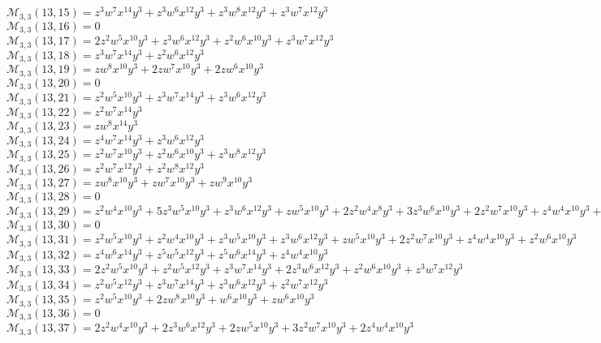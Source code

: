\documentclass[12pt]{memoireuqam1.3}
\begin{document}
$\mathcal{M}_{3,3}(13,15)=z^3w^7x^{14}y^3+z^3w^6x^{12}y^3+z^3w^8x^{12}y^3+z^3w^7x^{12}y^3$\\
$\mathcal{M}_{3,3}(13,16)=0$\\
$\mathcal{M}_{3,3}(13,17)=2z^2w^5x^{10}y^3+z^3w^6x^{12}y^3+z^2w^6x^{10}y^3+z^3w^7x^{12}y^3$\\
$\mathcal{M}_{3,3}(13,18)=z^3w^7x^{14}y^3+z^2w^6x^{12}y^3$\\
$\mathcal{M}_{3,3}(13,19)=zw^8x^{10}y^3+2zw^7x^{10}y^3+2zw^6x^{10}y^3$\\
$\mathcal{M}_{3,3}(13,20)=0$\\
$\mathcal{M}_{3,3}(13,21)=z^2w^5x^{10}y^3+z^3w^7x^{14}y^3+z^3w^6x^{12}y^3$\\
$\mathcal{M}_{3,3}(13,22)=z^2w^7x^{14}y^3$\\
$\mathcal{M}_{3,3}(13,23)=zw^8x^{14}y^3$\\
$\mathcal{M}_{3,3}(13,24)=z^4w^7x^{14}y^3+z^3w^6x^{12}y^3$\\
$\mathcal{M}_{3,3}(13,25)=z^2w^7x^{10}y^3+z^2w^6x^{10}y^3+z^3w^8x^{12}y^3$\\
$\mathcal{M}_{3,3}(13,26)=z^2w^7x^{12}y^3+z^2w^8x^{12}y^3$\\
$\mathcal{M}_{3,3}(13,27)=zw^8x^{10}y^3+zw^7x^{10}y^3+zw^9x^{10}y^3$\\
$\mathcal{M}_{3,3}(13,28)=0$\\
$\mathcal{M}_{3,3}(13,29)=z^2w^4x^{10}y^3+5z^3w^5x^{10}y^3+z^3w^6x^{12}y^3+zw^5x^{10}y^3+2z^2w^4x^8y^3+3z^3w^6x^{10}y^3+2z^2w^7x^{10}y^3+z^4w^4x^{10}y^3+z^2w^5x^8y^3$\\
$\mathcal{M}_{3,3}(13,30)=0$\\
$\mathcal{M}_{3,3}(13,31)=z^2w^5x^{10}y^3+z^2w^4x^{10}y^3+z^3w^5x^{10}y^3+z^3w^6x^{12}y^3+zw^5x^{10}y^3+2z^2w^7x^{10}y^3+z^4w^4x^{10}y^3+z^2w^6x^{10}y^3$\\
$\mathcal{M}_{3,3}(13,32)=z^4w^6x^{14}y^3+z^5w^5x^{12}y^3+z^5w^6x^{14}y^3+z^4w^4x^{10}y^3$\\
$\mathcal{M}_{3,3}(13,33)=2z^2w^5x^{10}y^3+z^2w^5x^{12}y^3+z^3w^7x^{14}y^3+2z^3w^6x^{12}y^3+z^2w^6x^{10}y^3+z^3w^7x^{12}y^3$\\
$\mathcal{M}_{3,3}(13,34)=z^2w^5x^{12}y^3+z^3w^7x^{14}y^3+z^3w^6x^{12}y^3+z^2w^7x^{12}y^3$\\
$\mathcal{M}_{3,3}(13,35)=z^2w^5x^{10}y^3+2zw^8x^{10}y^3+w^6x^{10}y^3+zw^6x^{10}y^3$\\
$\mathcal{M}_{3,3}(13,36)=0$\\
$\mathcal{M}_{3,3}(13,37)=2z^2w^4x^{10}y^3+2z^3w^6x^{12}y^3+2zw^5x^{10}y^3+3z^2w^7x^{10}y^3+2z^4w^4x^{10}y^3$\\
\end{document}
